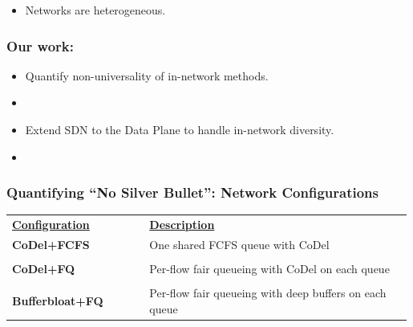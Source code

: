 \begin{Large}
\begin{frame}[plain]
\begin{itemize}
\item{Networks are heterogeneous.}

\end{itemize}
\end{frame}

\begin{frame}[plain]
\frametitle{Our work:}
\begin{itemize}
\item{Quantify non-universality of in-network methods.}
\item[]

\item{Extend SDN to the Data Plane to handle in-network diversity.}
\item[]

\end{itemize}
\end{frame}

\begin{frame}[plain]
\frametitle{Quantifying ``No Silver Bullet'': Network Configurations}
\begin{table}
\begin{tabular}{|p{0.34\linewidth}|p{0.65\linewidth}|}
\hline
{\bf \underline{Configuration}} & {\bf \underline{Description}} \\
{\bf CoDel+FCFS} & One shared FCFS queue with CoDel\\
& \\
{\bf CoDel+FQ} & Per-flow fair queueing with CoDel on each queue\\ 
&\\
{\bf Bufferbloat+FQ} & Per-flow fair queueing with deep buffers on
each queue\\ 
\hline
\end{tabular}
\end{table}
\end{frame}


\end{Large}
